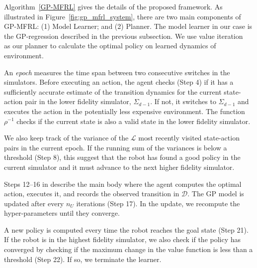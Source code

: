 \documentclass[12pt]{report}
\begin{document}
Algorithm~\ref{GP-MFRL} gives the details of the proposed framework. As illustrated in Figure~\ref{fig:gp_mfrl_system}, there are two main components of GP-MFRL: (1) Model Learner; and (2) Planner. The model learner in our case is the GP-regression described in the previous subsection. We use value iteration~\cite{sutton1998reinforcement} as our planner to calculate the optimal policy on learned dynamics of environment. 

An \emph{epoch} measures the time span between two consecutive switches in the simulators. Before executing an action, the agent checks (Step 4) if it has a sufficiently accurate estimate of the transition dynamics for the current state-action pair in the lower fidelity simulator, $\Sigma_{d-1}$. If not, it switches to $\Sigma_{d-1}$ and executes the action in the potentially less expensive environment. The function $\rho^{-1}$ checks if the current state is also a valid state in the lower fidelity simulator. 

We also keep track of the variance of the $\mathcal{L}$ most recently visited state-action pairs in the current epoch. If the running sum of the variances is below a threshold (Step 8), this suggest that the robot has found a good policy in the current simulator and it must advance to the next higher fidelity simulator.

Steps 12--16 in describe the main body where the agent computes the optimal action, executes it, and records the observed transition in $\mathcal{D}$. The GP model is updated after every $n_U$ iterations (Step 17). In the update, we recompute the hyper-parameters until they converge.

A new policy is computed every time the robot reaches the goal state (Step 21). If the robot is in the highest fidelity simulator, we also check if the policy has converged by checking if the maximum change in the value function is less than a threshold (Step 22). If so, we terminate the learner.
\pagebreak

\addtolength{\topmargin}{-.875in}
\end{document}
